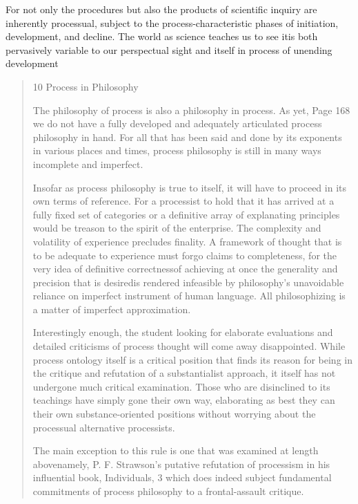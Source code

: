 \documentclass[a4paper]{Thesis}
\begin{document}
	For not only the procedures but also the products of scientific inquiry are inherently
	processual, subject to the process-characteristic phases of initiation, development, and
	decline. The world as science teaches us to see itis both pervasively variable to our
	perspectual sight and itself in process of unending development
	\begin{quotation}
		
	\end{quotation}
	
	\begin{quotation}
		10
		Process in Philosophy
		
		The philosophy of process is also a
		philosophy in process. As yet,
		Page 168
		we do not have a fully developed and adequately articulated process philosophy in hand.
		For all that has been said and done by its exponents in various places and times, process
		philosophy is still in many ways incomplete and imperfect.
		
		Insofar as process philosophy is true to itself, it will have to proceed in its own terms of
		reference. For a processist to hold that it has arrived at a fully fixed set of categories or a
		definitive array of explanating principles would be treason to the spirit of the enterprise.
		The complexity and volatility of experience precludes finality. A framework of thought
		that is to be adequate to experience must forgo claims to completeness, for the very idea
		of definitive correctnessof achieving at once the generality and precision that is desiredis
		rendered infeasible by philosophy's unavoidable reliance on imperfect instrument of
		human language. All philosophizing is a matter of imperfect approximation.
		
		Interestingly enough, the student looking for elaborate evaluations and detailed criticisms
		of process thought will come away disappointed. While process ontology itself is a critical
		position that finds its reason for being in the critique and refutation of a substantialist
		approach, it itself has not undergone much critical examination. Those who are
		disinclined to its teachings have simply gone their own way, elaborating as best they can
		their own substance-oriented positions without worrying about the processual alternative
		processists.
		
		The main exception to this rule is one that was examined at length abovenamely, P. F.
		Strawson's putative refutation of processism in his influential book, Individuals, 3 which
		does indeed subject fundamental commitments of process philosophy to a frontal-assault
		critique.
		

\end{quotation}
\end{document}
